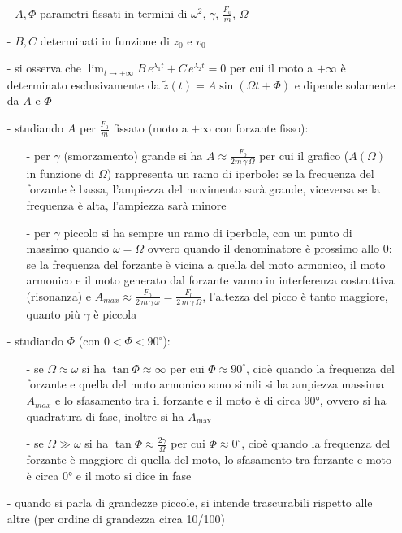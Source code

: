\documentclass[a4paper]{article}
\begin{document}
\begin{itemize}[topsep=3pt, itemsep=0pt]
	\item[-] \(A, \Phi\) parametri fissati in termini di \(\omega^2\), \(\gamma\), \(\frac{F_0}{m}\), \(\Omega\)
	\item[-] \(B, C\) determinati in funzione di \(z_0\) e \(v_0\)
	\item[-] si osserva che \(\displaystyle \lim_{t \to +\infty} B \, e^{\lambda_1 t} + C \, e^{\lambda_2 t} = 0\) per cui il moto a \(+\infty\) è determinato
	esclusivamente da \(\tilde{z}(t) = A \sin (\Omega t + \Phi)\) e dipende solamente da \(A\) e \(\Phi\)
	\item[-] studiando \(A\) per \(\frac{F_0}{m}\) fissato (moto a \(+\infty\) con forzante fisso):
	\begin{itemize}[topsep=0pt, itemsep=0pt]
		\item[-] per \(\gamma\) (smorzamento) grande si ha \(\displaystyle A \approx \frac{F_0}{2 m \, \gamma \, \Omega}\)
		per cui il grafico (\(A(\Omega)\) in funzione di \(\Omega\)) rappresenta un ramo di iperbole: se la frequenza del forzante
		è bassa, l'ampiezza del movimento sarà grande, viceversa se la frequenza è alta, l'ampiezza sarà minore
		\item[-] per \(\gamma\) piccolo si ha sempre un ramo di iperbole, con un punto di massimo quando \(\omega = \Omega\) ovvero
		quando il denominatore è prossimo allo 0: se la frequenza del forzante è vicina a quella del moto armonico, il moto armonico
		e il moto generato dal forzante vanno in interferenza costruttiva (risonanza) e \(\displaystyle A_{max} \approx \frac{F_0}{2 \, m \, \gamma \, \omega} = \frac{F_0}{2 \, m \, \gamma \, \Omega}\),
		l'altezza del picco è tanto maggiore, quanto più \(\gamma\) è piccola 
	\end{itemize}
	\item[-] studiando \(\Phi\) (con \(0 < \Phi < 90^\circ\)):
	\begin{itemize}[topsep=0pt, itemsep=0pt]
		\item[-] se \(\Omega \approx \omega\) si ha \(\tan \Phi \approx \infty\) per cui \(\Phi \approx 90^\circ\), cioè quando la
		frequenza del forzante e quella del moto armonico sono simili si ha ampiezza massima \(A_{max}\) e lo sfasamento tra il forzante
		e il moto è di circa 90°, ovvero si ha quadratura di fase, inoltre si ha \(A_\text{max}\)
		\item[-] se \(\Omega \gg \omega\) si ha \(\tan \Phi \approx \frac{2 \gamma}{\Omega}\) per cui \(\Phi \approx 0^\circ\), cioè
		quando la frequenza del forzante è maggiore di quella del moto, lo sfasamento tra forzante e moto è circa 0° e il moto si
		dice in fase
	\end{itemize}
	\item[-] quando si parla di grandezze piccole, si intende trascurabili rispetto alle altre (per ordine di grandezza circa 10/100)
\end{itemize}
\end{document}
